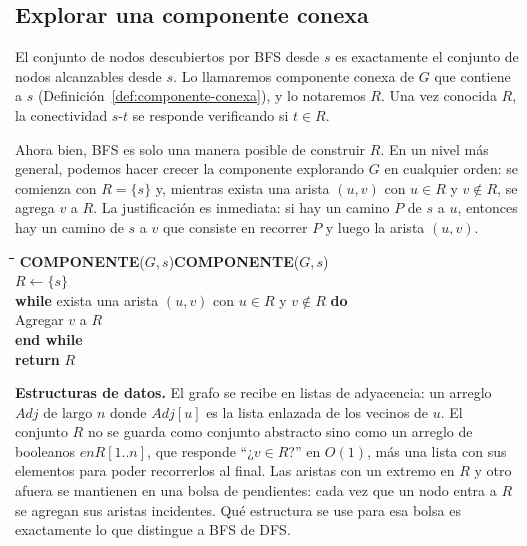 \documentclass[12pt, spanish, oneside, openany]{book}
\newcommand{\pl}[1]{\makebox[1.6em][r]{\texttt{\footnotesize #1}}\hspace{0.9em}}
\newenvironment{pseudo}[1]{%
  \begin{center}%
  \begin{mdframed}[style=pseudobox]%
  \small
  \begin{tabbing}%
  \hspace{2.5em}\=\hspace{1.5em}\=\hspace{1.5em}\=\hspace{1.5em}\=\hspace{1.5em}\=\kill
  \def\pseudotitulo{#1}\ifx\pseudotitulo\empty\else#1\\[3pt]\fi}%
  {\end{tabbing}\end{mdframed}\end{center}}
\newenvironment{estructuras}%
  {\begin{center}\begin{minipage}{0.93\textwidth}\begin{mdframed}[style=estrbox]%
   \small\textbf{Estructuras de datos.}\;}%
  {\end{mdframed}\end{minipage}\end{center}}
\theoremstyle{uprightplain}
\theoremstyle{definition}
\theoremstyle{remark}
\theoremstyle{definition}
\begin{document}
\subsection{Explorar una componente conexa}

El conjunto de nodos descubiertos por BFS desde $s$ es exactamente el conjunto de nodos alcanzables desde $s$. Lo llamaremos componente conexa de $G$ que contiene a $s$ (Definición~\ref{def:componente-conexa}), y lo notaremos $R$. Una vez conocida $R$, la conectividad $s$-$t$ se responde verificando si $t\in R$.

Ahora bien, BFS es solo una manera posible de construir $R$. En un nivel más general, podemos hacer crecer la componente explorando $G$ en cualquier orden: se comienza con $R=\{s\}$ y, mientras exista una arista $(u,v)$ con $u\in R$ y $v\notin R$, se agrega $v$ a $R$. La justificación es inmediata: si hay un camino $P$ de $s$ a $u$, entonces hay un camino de $s$ a $v$ que consiste en recorrer $P$ y luego la arista $(u,v)$.

\begin{pseudo}{\textbf{COMPONENTE}($G,s$)}
\pl{1}\> $R \leftarrow \{s\}$\\
\pl{2}\> \textbf{while} exista una arista $(u,v)$ con $u\in R$ y $v\notin R$ \textbf{do}\\
\pl{3}\>\> Agregar $v$ a $R$\\
\pl{4}\> \textbf{end while}\\
\pl{5}\> \textbf{return} $R$
\end{pseudo}

\begin{estructuras}
El grafo se recibe en listas de adyacencia: un arreglo $\mathit{Adj}$
de largo $n$ donde $\mathit{Adj}[u]$ es la lista enlazada de los vecinos de $u$.
El conjunto $R$ no se guarda como conjunto abstracto sino como un
arreglo de booleanos $\mathit{enR}[1..n]$, que responde ``¿$v\in R$?''
en $O(1)$, más una lista con sus elementos para poder recorrerlos al
final. Las aristas con un extremo en $R$ y otro afuera se mantienen en una
bolsa de pendientes: cada vez que un nodo entra a $R$ se agregan sus
aristas incidentes. Qué estructura se use para esa bolsa es exactamente lo que
distingue a BFS de DFS.
\end{estructuras}
\end{document}
